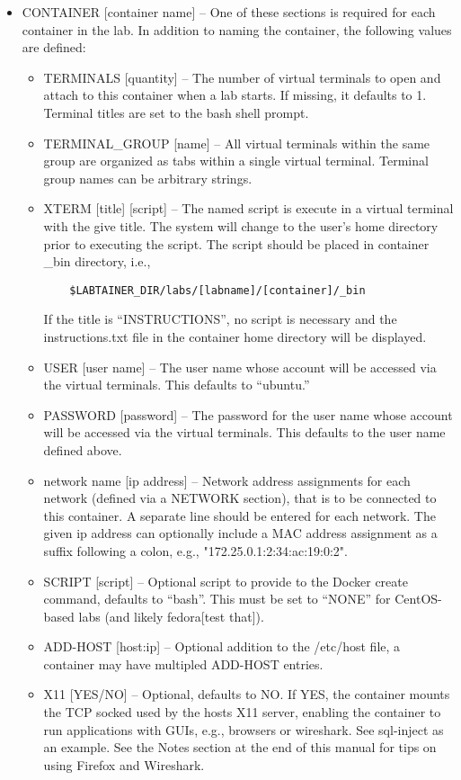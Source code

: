\documentclass[12pt]{article}
\begin{document}
\begin{itemize}
\item CONTAINER [container name] -- One of these sections is required for each container in the lab.
In addition to naming the container, the following values are defined: 

\begin{itemize}
\item TERMINALS [quantity] -- The number of virtual terminals to open and attach to this 
container when a lab starts.  If missing, it defaults to 1. Terminal titles are set to the 
bash shell prompt.
\item TERMINAL\_GROUP [name] -- All virtual terminals within the same group are organized as
tabs within a single virtual terminal.  Terminal group names can be arbitrary strings.
\item XTERM [title] [script] -- The named script is execute in a virtual terminal with the
give title.   The system will change to the user's home directory prior to executing the
script.  The script should be placed in container \_bin directory, i.e.,
\begin{verbatim}
    $LABTAINER_DIR/labs/[labname]/[container]/_bin
\end{verbatim}
\noindent If the title is ``INSTRUCTIONS'', no script is necessary and the instructions.txt file
in the container home directory will be displayed.
\item USER [user name] -- The user name whose account will be accessed via the virtual terminals. 
This defaults to ``ubuntu.''
\item PASSWORD [password] -- The password for the user name whose account will be accessed via the virtual terminals. 
This defaults to the user name defined above.
\item network name [ip address] -- Network address assignments for each network (defined via a NETWORK section), 
that is to be connected to this container.  A separate line should be entered for each network.  The given ip address 
can optionally include a MAC address assignment as a suffix following a colon, e.g., "172.25.0.1:2:34:ac:19:0:2".
\item SCRIPT [script] -- Optional script to provide to the Docker create command, defaults to ``bash''.  This must be set to
``NONE'' for CentOS-based labs (and likely fedora[test that]).
\item ADD-HOST [host:ip] -- Optional addition to the /etc/host file, a container may have multipled ADD-HOST entries.
\item X11 [YES/NO] -- Optional, defaults to NO.  If YES, the container mounts the TCP socked used by the hosts X11 server,
enabling the container to run applications with GUIs, e.g., browsers or wireshark.  See sql-inject as an example.  See the
Notes section at the end of this manual for tips on using Firefox and Wireshark.

\end{itemize}
\end{itemize}
  
\end{document}
